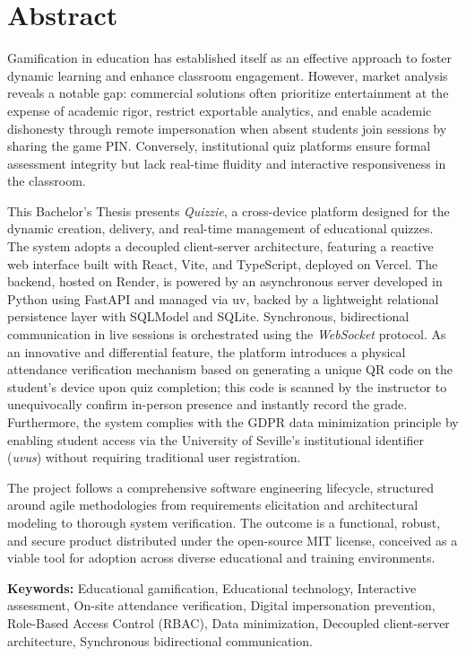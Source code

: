 \chapter*{Abstract}

Gamification in education has established itself as an effective approach to foster dynamic learning and enhance classroom engagement. However, market analysis reveals a notable gap: commercial solutions often prioritize entertainment at the expense of academic rigor, restrict exportable analytics, and enable academic dishonesty through remote impersonation when absent students join sessions by sharing the game PIN. Conversely, institutional quiz platforms ensure formal assessment integrity but lack real-time fluidity and interactive responsiveness in the classroom.

This Bachelor's Thesis presents \textit{Quizzie}, a cross-device platform designed for the dynamic creation, delivery, and real-time management of educational quizzes. The system adopts a decoupled client-server architecture, featuring a reactive web interface built with React, Vite, and TypeScript, deployed on Vercel. The backend, hosted on Render, is powered by an asynchronous server developed in Python using FastAPI and managed via uv, backed by a lightweight relational persistence layer with SQLModel and SQLite. Synchronous, bidirectional communication in live sessions is orchestrated using the \textit{WebSocket} protocol. As an innovative and differential feature, the platform introduces a physical attendance verification mechanism based on generating a unique QR code on the student's device upon quiz completion; this code is scanned by the instructor to unequivocally confirm in-person presence and instantly record the grade. Furthermore, the system complies with the GDPR data minimization principle by enabling student access via the University of Seville's institutional identifier (\textit{uvus}) without requiring traditional user registration.

The project follows a comprehensive software engineering lifecycle, structured around agile methodologies from requirements elicitation and architectural modeling to thorough system verification. The outcome is a functional, robust, and secure product distributed under the open-source MIT license, conceived as a viable tool for adoption across diverse educational and training environments.

\vspace{0.5cm}

\textbf{Keywords:} Educational gamification, Educational technology, Interactive assessment, On-site attendance verification, Digital impersonation prevention, Role-Based Access Control (RBAC), Data minimization, Decoupled client-server architecture, Synchronous bidirectional communication.